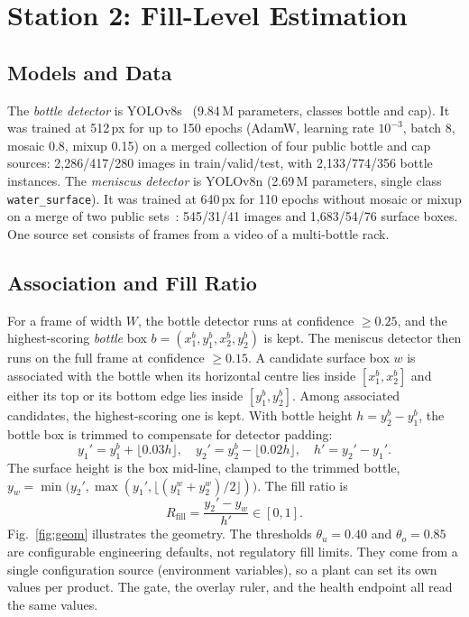 \documentclass[conference]{IEEEtran}
\begin{document}
\section{Station 2: Fill-Level Estimation}
\subsection{Models and Data}
The \textit{bottle detector} is YOLOv8s~\cite{yolov8} (9.84\,M parameters, classes bottle and cap). It was trained at 512\,px for up to 150 epochs (AdamW, learning rate $10^{-3}$, batch 8, mosaic 0.8, mixup 0.15) on a merged collection of four public bottle and cap sources: 2{,}286/417/280 images in train/valid/test, with 2{,}133/774/356 bottle instances. The \textit{meniscus detector} is YOLOv8n (2.69\,M parameters, single class \texttt{water\_surface}). It was trained at 640\,px for 110 epochs without mosaic or mixup on a merge of two public sets~\cite{filldata1,filldata2}: 545/31/41 images and 1{,}683/54/76 surface boxes. One source set consists of frames from a video of a multi-bottle rack.

\subsection{Association and Fill Ratio}
For a frame of width $W$, the bottle detector runs at confidence $\geq0.25$, and the highest-scoring \emph{bottle} box $b=(x_1^b,y_1^b,x_2^b,y_2^b)$ is kept. The meniscus detector then runs on the full frame at confidence $\geq0.15$. A candidate surface box $w$ is associated with the bottle when its horizontal centre lies inside $[x_1^b,x_2^b]$ and either its top or its bottom edge lies inside $[y_1^b,y_2^b]$. Among associated candidates, the highest-scoring one is kept. With bottle height $h=y_2^b-y_1^b$, the bottle box is trimmed to compensate for detector padding:
\begin{equation}
y_1' = y_1^b+\lfloor0.03h\rfloor,\quad y_2' = y_2^b-\lfloor0.02h\rfloor,\quad h'=y_2'-y_1'.
\end{equation}
The surface height is the box mid-line, clamped to the trimmed bottle, $y_w=\min\bigl(y_2',\max(y_1',\lfloor (y_1^w+y_2^w)/2\rfloor)\bigr)$. The fill ratio is
\begin{equation}
R_{\mathrm{fill}}=\frac{y_2'-y_w}{h'}\in[0,1].
\label{eq:ratio}
\end{equation}
Fig.~\ref{fig:geom} illustrates the geometry. The thresholds $\theta_u{=}0.40$ and $\theta_o{=}0.85$ are configurable engineering defaults, not regulatory fill limits. They come from a single configuration source (environment variables), so a plant can set its own values per product. The gate, the overlay ruler, and the health endpoint all read the same values.
\end{document}

